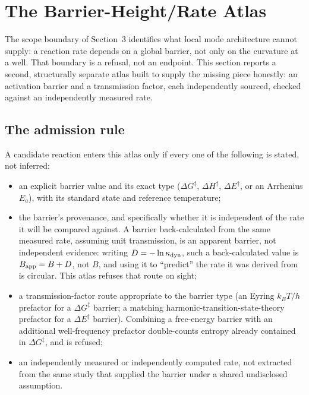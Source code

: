 \section{The Barrier-Height/Rate Atlas}

The scope boundary of Section~3 identifies what local mode architecture
cannot supply: a reaction rate depends on a global barrier, not only on the
curvature at a well. That boundary is a refusal, not an endpoint. This
section reports a second, structurally separate atlas built to supply the
missing piece honestly: an activation barrier and a transmission factor,
each independently sourced, checked against an independently measured rate.

\subsection{The admission rule}

A candidate reaction enters this atlas only if every one of the following is
stated, not inferred:

\begin{itemize}
\item an explicit barrier value and its exact type (\(\Delta G^{\ddagger}\),
\(\Delta H^{\ddagger}\), \(\Delta E^{\ddagger}\), or an Arrhenius \(E_a\)),
with its standard state and reference temperature;
\item the barrier's provenance, and specifically whether it is independent
of the rate it will be compared against. A barrier back-calculated from the
same measured rate, assuming unit transmission, is an apparent barrier, not
independent evidence: writing \(D=-\ln\kappa_{\rm dyn}\), such a
back-calculated value is \(B_{\rm app}=B+D\), not \(B\), and using it to
``predict'' the rate it was derived from is circular. This atlas refuses
that route on sight;
\item a transmission-factor route appropriate to the barrier type (an Eyring
\(k_BT/h\) prefactor for a \(\Delta G^{\ddagger}\) barrier; a matching
harmonic-transition-state-theory prefactor for a \(\Delta E^{\ddagger}\)
barrier). Combining a free-energy barrier with an additional well-frequency
prefactor double-counts entropy already contained in
\(\Delta G^{\ddagger}\), and is refused;
\item an independently measured or independently computed rate, not
extracted from the same study that supplied the barrier under a shared
undisclosed assumption.
\end{itemize}

